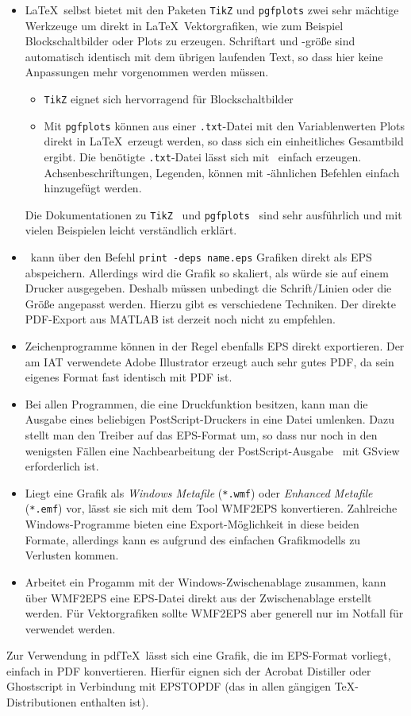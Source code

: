 \begin{itemize}
\item \LaTeX\ selbst bietet mit den Paketen \texttt{TikZ} und \texttt{pgfplots} 
	zwei sehr mächtige Werkzeuge um direkt in \LaTeX\ Vektorgrafiken, wie zum Beispiel
	Blockschaltbilder oder Plots zu erzeugen. Schriftart und -größe sind automatisch identisch
	mit dem übrigen laufenden Text, so dass hier keine Anpassungen mehr vorgenommen werden müssen.
	\begin{itemize}
		\item \texttt{TikZ} eignet sich hervorragend für Blockschaltbilder
		\item Mit \texttt{pgfplots} können aus einer \texttt{.txt}-Datei mit den Variablenwerten
					Plots direkt in \LaTeX\ erzeugt werden, so dass sich ein einheitliches
					Gesamtbild ergibt. Die benötigte \texttt{.txt}-Datei lässt sich mit \Matlab\ einfach
					erzeugen. Achsenbeschriftungen, Legenden, \etc können mit \Matlab-ähnlichen
					Befehlen einfach hinzugefügt werden.
	\end{itemize}
	Die Dokumentationen zu \texttt{TikZ}~\cite{TikZ} und \texttt{pgfplots}~\cite{pgfplots} sind
	sehr ausführlich und mit vielen Beispielen leicht verständlich erklärt.
	
	
\item \Matlab\ kann über den Befehl \verb|print -deps name.eps| Grafiken direkt
  als EPS abspeichern. Allerdings wird die Grafik so skaliert, als würde sie auf
  einem Drucker ausgegeben. Deshalb müssen unbedingt die Schrift/Linien oder die
  Größe angepasst werden. Hierzu gibt es verschiedene Techniken. Der direkte
  PDF-Export aus MATLAB ist derzeit noch nicht zu empfehlen.
\item Zeichenprogramme können in der Regel ebenfalls EPS direkt exportieren.
  Der am IAT verwendete Adobe Illustrator erzeugt auch sehr gutes PDF, da sein
  eigenes Format fast identisch mit PDF ist.
\item Bei allen Programmen, die eine Druckfunktion besitzen, kann man die
  Ausgabe eines beliebigen PostScript-Druckers in eine Datei umlenken. Dazu
  stellt man den Treiber auf das EPS-Format um, so dass nur noch in den
  wenigsten Fällen eine Nachbearbeitung der PostScript-Ausgabe \zB\ mit GSview
  erforderlich ist.
\item Liegt eine Grafik als \emph{Windows Metafile} (\verb|*.wmf|) oder
  \emph{Enhanced Metafile} (\verb|*.emf|) vor, lässt sie sich mit dem Tool
  WMF2EPS konvertieren. Zahlreiche Windows-Programme bieten eine
  Export-Möglichkeit in diese beiden Formate, allerdings kann es aufgrund des
  einfachen Grafikmodells zu Verlusten kommen.
\item Arbeitet ein Progamm mit der Windows-Zwischenablage zusammen, kann über
  WMF2EPS eine EPS-Datei direkt aus der Zwischenablage erstellt werden. Für
  Vektorgrafiken sollte WMF2EPS aber generell nur im Notfall für verwendet
  werden.
\end{itemize}
Zur Verwendung in pdf\TeX\ lässt sich eine Grafik, die im EPS-Format vorliegt,
einfach in PDF konvertieren. Hierfür eignen sich der Acrobat Distiller oder
Ghostscript in Verbindung mit EPSTOPDF (das in allen gängigen TeX-Distributionen
enthalten ist).


